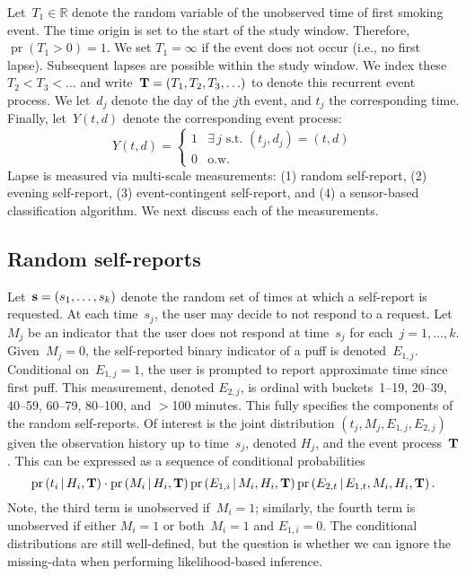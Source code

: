 \documentclass[11pt]{amsart}
\def\pr{\mathop{\text{pr}}\nolimits}
\def\pr{\mathop{\text{pr}}\nolimits}
\def\given{\, | \,}
\def\bfs{{\bf s}}
\def\bfT{{\bf T}}
\begin{document}
Let~$T_1 \in \mathbb{R}$ denote the random variable of the unobserved
time of first smoking event. The time origin is set to the start of
the study window.  Therefore,~$\pr (T_1 > 0 ) = 1$. We set $T_1 =
\infty$ if the event does not occur (i.e., no first lapse). Subsequent
lapses are possible within the study window. We index these~$T_{2} <
T_{3} < \ldots$ and write~$\bfT = (T_1, T_2, T_3,\ldots)$ to denote
this recurrent event process.  We let~$d_j$ denote the day of the
$j$th event, and $t_j$ the corresponding time.
Finally, let~$Y(t,d)$ denote the corresponding event process:
\[
  Y(t,d) = \left \{
    \begin{array}{cc}
      1 & \exists \, j \text{ s.t. } (t_j,d_j) = (t,d) \\
      0 & \text{o.w.} \end{array} \right .
\]
Lapse is measured via multi-scale measurements: (1) random
self-report, (2) evening self-report, (3) event-contingent
self-report, and (4) a sensor-based classification algorithm.
We next discuss each of the measurements.

\subsection{Random self-reports}
\label{section:randomEMAs}

Let~$\bfs = (s_{1}, \ldots, s_{k})$ denote the random set of times at
which a self-report is requested.
At each time~$s_j$, the user may decide to not respond to a request.
Let~$M_{j}$ be an indicator that the user does not respond at
time~$s_j$ for each~$j=1,\ldots,k$.
Given~$M_{j} = 0$, the self-reported binary indicator of a puff is
denoted~$E_{1,j}$.  Conditional on~$E_{1,j} = 1$, the user is prompted
to report approximate time since first puff. This measurement, denoted
$E_{2, j}$, is ordinal with buckets~1--19, 20--39, 40--59, 60--79,
80--100, and $>$100 minutes.  This fully specifies the components of
the random self-reports. Of interest is the joint distribution $(t_j,
M_{j}, E_{1, j}, E_{2, j})$ given the observation history up to
time~$s_j$, denoted $H_{j}$, and the event process~$\bfT$.  This can
be expressed as a sequence of conditional probabilities
\begin{equation}
  \label{eq:jointdensity}
  \pr \left( t_i \given H_{i}, \bfT \right) \cdot \pr \left( M_{i}
    \given H_{i}, \bfT \right) \pr \left( E_{1,i} \given M_{i}, H_{i},
  \bfT \right) \pr \left(E_{2,t} \given E_{1,t}, M_{i}, H_{i}, \bfT \right).
\end{equation}
Note, the third term is unobserved if~$M_{i} = 1$; similarly, the
fourth term is unobserved if either $M_{i}=1$ or both~$M_{i}=1$
and $E_{1,i} = 0$.  The conditional distributions are still
well-defined, but the question is whether we can ignore the
missing-data when performing likelihood-based inference.
\end{document}

